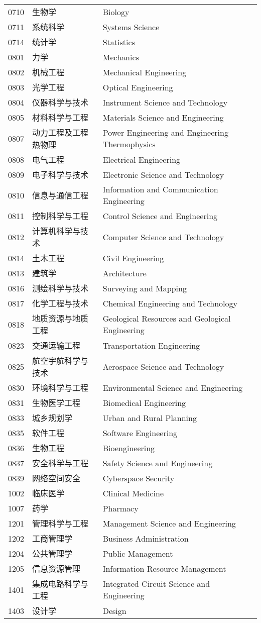 {\begin{longtable}{lll}
0710 & 生物学 & Biology \\
0711 & 系统科学 & Systems Science \\
0714 & 统计学 & Statistics \\
0801 & 力学 & Mechanics \\
0802 & 机械工程 & Mechanical Engineering \\
0803 & 光学工程 & Optical Engineering \\
0804 & 仪器科学与技术 & Instrument Science and Technology \\
0805 & 材料科学与工程 & Materials Science and Engineering \\
0807 & 动力工程及工程热物理 & Power Engineering and Engineering Thermophysics \\
0808 & 电气工程 & Electrical Engineering \\
0809 & 电子科学与技术 & Electronic Science and Technology \\
0810 & 信息与通信工程 & Information and Communication Engineering \\
0811 & 控制科学与工程 & Control Science and Engineering \\
0812 & 计算机科学与技术 & Computer Science and Technology \\
0814 & 土木工程 & Civil Engineering \\
0813 & 建筑学 & Architecture \\
0816 & 测绘科学与技术 & Surveying and Mapping \\
0817 & 化学工程与技术 & Chemical Engineering and Technology \\
0818 & 地质资源与地质工程 & Geological Resources and Geological Engineering \\
0823 & 交通运输工程 & Transportation Engineering \\
0825 & 航空宇航科学与技术 & Aerospace Science and Technology \\
0830 & 环境科学与工程 & Environmental Science and Engineering \\
0831 & 生物医学工程 & Biomedical Engineering \\
0833 & 城乡规划学 & Urban and Rural Planning \\
0835 & 软件工程 & Software Engineering \\
0836 & 生物工程 & Bioengineering \\
0837 & 安全科学与工程 & Safety Science and Engineering \\
0839 & 网络空间安全 & Cyberspace Security \\
1002 & 临床医学 & Clinical Medicine \\
1007 & 药学 & Pharmacy \\
1201 & 管理科学与工程 & Management Science and Engineering \\
1202 & 工商管理学 & Business Administration \\
1204 & 公共管理学 & Public Management \\
1205 & 信息资源管理 & Information Resource Management \\
1401 & 集成电路科学与工程 & Integrated Circuit Science and Engineering \\
1403 & 设计学 & Design \\
\end{longtable}
}%
